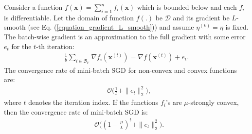 \documentclass[lang=cn,10pt]{gorgeousnbook}
\numberwithin{equation}{section}%
\numberwithin{figure}{section}%
\begin{document}
\begin{theorem}
Consider a function $f(\boldsymbol{x}) = \sum_{i=1}^n f_i(\boldsymbol{x})$ which is bounded below and each $f_i$ is differentiable. Let the domain of function $f(.)$ be $\mathcal{D}$ and its gradient be $L$-smooth (see Eq. (\ref{equation_gradient_L_smooth})) and assume $\eta^{(k)} = \eta$ is fixed.
The batch-wise gradient is an approximation to the full gradient with some error $e_t$ for the $t$-th iteration:
\begin{align}\label{equation_minibatch_SGD_error}
\frac{1}{b} \sum_{i \in \mathcal{B}_{t'}} \nabla f_i(\boldsymbol{x}^{(t)}) = \nabla f(\boldsymbol{x}^{(t)}) + e_t.
\end{align}
The convergence rate of mini-batch SGD for non-convex and convex functions are:
\begin{align}\label{equation_minibatch_SGD_convergence_rate_nonconvex}
& \mathcal{O}\big(\frac{1}{t} + \|e_t\|_2^2\big),
\end{align}
where $t$ denotes the iteration index. 
If the functions $f_i$'s are $\mu$-strongly convex, then the convergence rate of mini-batch SGD is:
\begin{align}\label{equation_minibatch_SGD_convergence_rate_strongly_convex}
& \mathcal{O}\big((1 - \frac{\mu}{L})^t + \|e_t\|_2^2\big).
\end{align}
\end{theorem}
\end{document}
